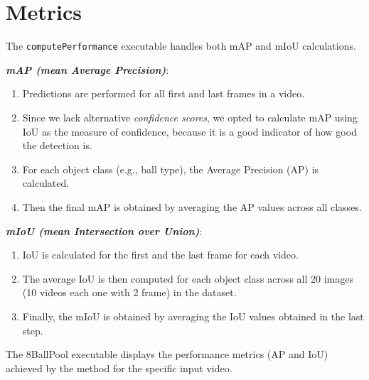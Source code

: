 \section{Metrics}
The \texttt{computePerformance} executable handles both mAP and mIoU calculations.

\noindent\textbf{\emph{mAP (mean Average Precision)}}:
\begin{enumerate}
	\item Predictions are performed for all first and last frames in a video.
	\item Since we lack alternative \textit{confidence scores}, we opted to calculate mAP using IoU as the measure of confidence, because it is a good indicator of how good the detection is.
	\item For each object class (e.g., ball type), the Average Precision (AP) is calculated.
	\item Then the final mAP is obtained by averaging the AP values across all classes.
\end{enumerate}

\noindent\textbf{\emph{mIoU (mean Intersection over Union)}}:
\begin{enumerate}
	\item IoU is calculated for the first and the last frame for each video.
	\item The average IoU is then computed for each object class across all 20 images (10 videos each one with 2 frame) in the dataset.
	\item Finally, the mIoU is obtained by averaging the IoU values obtained in the last step.
\end{enumerate}

The 8BallPool executable displays the performance metrics (AP and IoU) achieved by the method for the specific input video.
